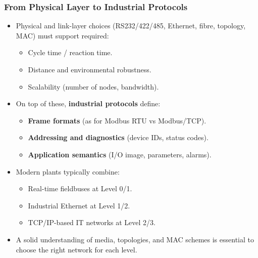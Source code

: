 \begin{frame}
	\frametitle{From Physical Layer to Industrial Protocols}
	\small
	\begin{itemize}
		\item Physical and link-layer choices (RS232/422/485, Ethernet, fibre, topology, MAC)
		must support required:
		\begin{itemize}
			\item Cycle time / reaction time.
			\item Distance and environmental robustness.
			\item Scalability (number of nodes, bandwidth).
		\end{itemize}
		\item On top of these, \textbf{industrial protocols} define:
		\begin{itemize}
			\item \textbf{Frame formats} (as for Modbus RTU vs Modbus/TCP).
			\item \textbf{Addressing and diagnostics} (device IDs, status codes).
			\item \textbf{Application semantics} (I/O image, parameters, alarms).
		\end{itemize}
		\item Modern plants typically combine:
		\begin{itemize}
			\item Real-time fieldbuses at Level 0/1.
			\item Industrial Ethernet at Level 1/2.
			\item TCP/IP-based IT networks at Level 2/3.
		\end{itemize}
		\item A solid understanding of media, topologies, and MAC schemes is essential
		to choose the right network for each level.
	\end{itemize}
\end{frame}

